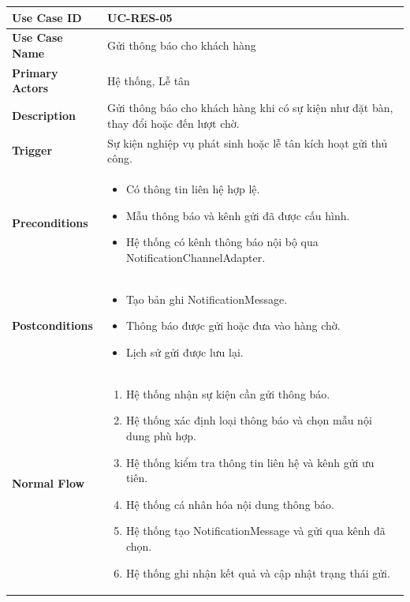 \begin{longtable}{|p{4cm}|p{10cm}|}
\hline
\textbf{Use Case ID} & UC-RES-05 \\ \hline
\textbf{Use Case Name} & Gửi thông báo cho khách hàng \\ \hline
\textbf{Primary Actors} & Hệ thống, Lễ tân \\ \hline

\textbf{Description} & Gửi thông báo cho khách hàng khi có sự kiện như đặt bàn, thay đổi hoặc đến lượt chờ. \\ \hline

\textbf{Trigger} & Sự kiện nghiệp vụ phát sinh hoặc lễ tân kích hoạt gửi thủ công. \\ \hline

\textbf{Preconditions} &
\begin{itemize}[leftmargin=*, noitemsep]
  \item Có thông tin liên hệ hợp lệ.
  \item Mẫu thông báo và kênh gửi đã được cấu hình.
  \item Hệ thống có kênh thông báo nội bộ qua \textsf{NotificationChannelAdapter}.
\end{itemize} \\ \hline

\textbf{Postconditions} &
\begin{itemize}[leftmargin=*, noitemsep]
  \item Tạo bản ghi \textsf{NotificationMessage}.
  \item Thông báo được gửi hoặc đưa vào hàng chờ.
  \item Lịch sử gửi được lưu lại.
\end{itemize} \\ \hline

\textbf{Normal Flow} &
\begin{enumerate}[leftmargin=*, noitemsep]
  \item Hệ thống nhận sự kiện cần gửi thông báo.
  \item Hệ thống xác định loại thông báo và chọn mẫu nội dung phù hợp.
  \item Hệ thống kiểm tra thông tin liên hệ và kênh gửi ưu tiên.
  \item Hệ thống cá nhân hóa nội dung thông báo.
  \item Hệ thống tạo \textsf{NotificationMessage} và gửi qua kênh đã chọn.
  \item Hệ thống ghi nhận kết quả và cập nhật trạng thái gửi.
\end{enumerate} \\ \hline


\end{longtable}
